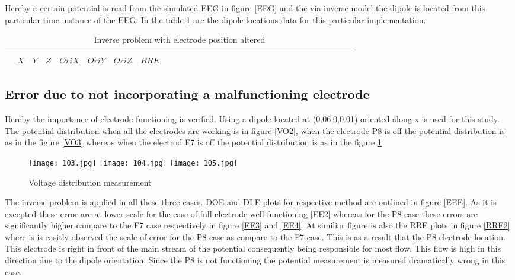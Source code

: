Hereby a certain potential is read from the simulated EEG in figure \ref{EEG} and the via inverse model the dipole is located from this particular time instance of the EEG. In the table \ref{Ta3} are the dipole locations data for this particular implementation.


\begin{table}[!htbp]
\centering
\caption{Inverse problem with electrode position altered}\label{Ta3}
\begin{tabular}{c c c c c c c c c c c c c c c c c c c c c c c c c c c c c c c }
\hline 
$ $&$X$&$Y$&$Z$&$OriX$&$OriY$&$OriZ$&$RRE$\\
\hline
 
\hline 
\end{tabular}
\end{table}


\newpage
\subsection{Error due to not incorporating a malfunctioning electrode}

Hereby the importance of electrode functioning is verified. Using a dipole located at (0.06,0,0.01) oriented along x is used for this study. The potential distribution when all the electrodes are working is in figure \ref{VO2}, when the electrode P8 is off the potential distribution is as in the figure \ref{VO3} whereas when the electrod F7 is off the potential distribution is as in the figure \ref{VO4}
\begin{figure}[!htbp]
%
\centering
\texttt{[image: 103.jpg]}
\label{VO2}
\endminipage\hfill
{}%
\centering
\texttt{[image: 104.jpg]}
\label{VO3}
\endminipage\hfill
{}%
\centering
\texttt{[image: 105.jpg]}
\label{VO4}
\endminipage\hfill
\caption{Voltage distribution measurement}
\end{figure}


The inverse problem is applied in all these three cases. DOE and DLE plots for respective method are outlined in figure \ref{EEE}. As it is excepted these error are at lower scale for the case of full electrode well functioning \ref{EE2} whereas for the P8 case these errors are significantly higher campare to the F7 case respectively in figure \ref{EE3} and \ref{EE4}. At similiar figure is also the RRE plots in figure \ref{RRE2} where is is easitly observed the scale of error for the P8 case as compare to the F7 case. This is as a result that the P8 electrode location. This electrode is right in front of the main stream of the potential consequently being responsible for most flow. This flow is high in this direction due to the dipole orientation. Since the P8 is not functioning the potential measurement is measured dramatically wrong in this case. 


